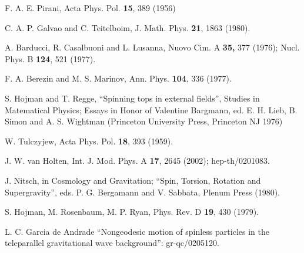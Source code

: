 \documentclass[a4paper,12pt]{article}
\begin{document}
\begin{thebibliography}{99}
  F. A. E. Pirani, Acta Phys. Pol. \textbf{15}, 389 (1956)

  C. A. P. Galvao and C. Teitelboim, J. Math. Phys. \textbf{21},
1863 (1980).

  A. Barducci, R. Casalbuoni and L. Lusanna, Nuovo Cim. A 
\textbf{35, }377 (1976); Nucl. Phys. B \textbf{124}, 521 (1977).

  F. A. Berezin and M. S. Marinov, Ann. Phys. \textbf{104}, 336
(1977).

  S. Hojman and T. Regge, ``Spinning tops in external fields'',
Studies in Matematical Physics; Essays in Honor of Valentine Bargmann, ed.
E. H. Lieb, B. Simon and A. S. Wightman (Princeton University Press,
Princeton NJ 1976)

  W. Tulczyjew, Acta Phys. Pol. \textbf{18}, 393 (1959).

  J. W. van Holten, Int. J. Mod. Phys. A \textbf{17}, 2645
(2002); hep-th/0201083.

  J. Nitsch, in Cosmology and Gravitation; ``Spin, Torsion,
Rotation and Supergravity'', eds. P. G. Bergamann and V. Sabbata, Plenum
Press (1980).

  S. Hojman, M. Rosenbaum, M. P. Ryan, Phys. Rev. D \textbf{19},
430 (1979).

  L. C. Garcia de Andrade {\small ``}Nongeodesic motion of
spinless particles in the teleparallel gravitational wave background'':
gr-qc/0205120.
\end{thebibliography}
\end{document}
